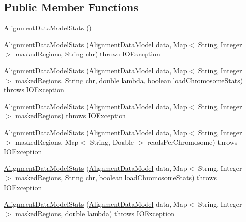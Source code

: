 \subsection*{Public Member Functions}
\begin{DoxyCompactItemize}
\item 
\hyperlink{classbroad_1_1pda_1_1seq_1_1segmentation_1_1_alignment_data_model_stats_ab002b67152d38b52b1d00cbefbe1e1cd}{Alignment\+Data\+Model\+Stats} ()
\item 
\hyperlink{classbroad_1_1pda_1_1seq_1_1segmentation_1_1_alignment_data_model_stats_ac427e7f9fc50d5d83a4b2bc4aa7b0de2}{Alignment\+Data\+Model\+Stats} (\hyperlink{interfacebroad_1_1pda_1_1seq_1_1segmentation_1_1_alignment_data_model}{Alignment\+Data\+Model} data, Map$<$ String, Integer $>$ masked\+Regions, String chr)  throws I\+O\+Exception 
\item 
\hyperlink{classbroad_1_1pda_1_1seq_1_1segmentation_1_1_alignment_data_model_stats_a451a71210dec6580faa5c58a9475b42b}{Alignment\+Data\+Model\+Stats} (\hyperlink{interfacebroad_1_1pda_1_1seq_1_1segmentation_1_1_alignment_data_model}{Alignment\+Data\+Model} data, Map$<$ String, Integer $>$ masked\+Regions, String chr, double lambda, boolean load\+Chromosome\+Stats)  throws I\+O\+Exception 
\item 
\hyperlink{classbroad_1_1pda_1_1seq_1_1segmentation_1_1_alignment_data_model_stats_a339b5c765b58d74236c8a9d0d0fd4e02}{Alignment\+Data\+Model\+Stats} (\hyperlink{interfacebroad_1_1pda_1_1seq_1_1segmentation_1_1_alignment_data_model}{Alignment\+Data\+Model} data, Map$<$ String, Integer $>$ masked\+Regions)  throws I\+O\+Exception 
\item 
\hyperlink{classbroad_1_1pda_1_1seq_1_1segmentation_1_1_alignment_data_model_stats_abf1128be29d2b6ed57cabc005a79ec0d}{Alignment\+Data\+Model\+Stats} (\hyperlink{interfacebroad_1_1pda_1_1seq_1_1segmentation_1_1_alignment_data_model}{Alignment\+Data\+Model} data, Map$<$ String, Integer $>$ masked\+Regions, Map$<$ String, Double $>$ reads\+Per\+Chromosome)  throws I\+O\+Exception 
\item 
\hyperlink{classbroad_1_1pda_1_1seq_1_1segmentation_1_1_alignment_data_model_stats_a35f318f92cccaf56ec48e625ed4590ca}{Alignment\+Data\+Model\+Stats} (\hyperlink{interfacebroad_1_1pda_1_1seq_1_1segmentation_1_1_alignment_data_model}{Alignment\+Data\+Model} data, Map$<$ String, Integer $>$ masked\+Regions, String chr, boolean load\+Chromosome\+Stats)  throws I\+O\+Exception 
\item 
\hyperlink{classbroad_1_1pda_1_1seq_1_1segmentation_1_1_alignment_data_model_stats_ac47b58955521f0ea4c6bcc82970c8860}{Alignment\+Data\+Model\+Stats} (\hyperlink{interfacebroad_1_1pda_1_1seq_1_1segmentation_1_1_alignment_data_model}{Alignment\+Data\+Model} data, Map$<$ String, Integer $>$ masked\+Regions, double lambda)  throws I\+O\+Exception 

\end{DoxyCompactItemize}
